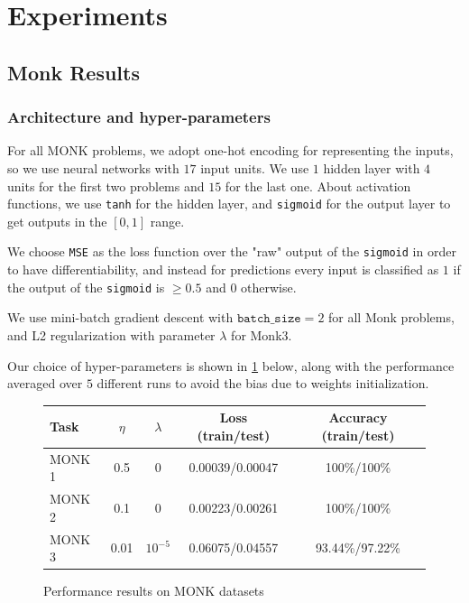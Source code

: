 \section{Experiments}

\subsection{Monk Results}

\subsubsection{Architecture and hyper-parameters}
For all MONK problems, we adopt one-hot encoding for representing the inputs, so we use neural networks with $17$ input units. We use $1$ hidden layer with $4$ units for the first two problems and $15$ for the last one. About activation functions, we use \texttt{tanh} for the hidden layer, and \texttt{sigmoid} for the output layer to get outputs in the $[0, 1]$ range.

We choose \texttt{MSE} as the loss function over the "raw" output of the \texttt{sigmoid} in order to have differentiability, and instead for predictions every input is classified as $1$ if the output of the \texttt{sigmoid} is $\ge 0.5$ and $0$ otherwise.

We use mini-batch gradient descent with $\texttt{batch\_size}=2$ for all Monk problems, and L2 regularization with parameter $\lambda$ for Monk3.

Our choice of hyper-parameters is shown in \cref{fig:hyper} below, along with the performance averaged over $5$ different runs to avoid the bias due to weights initialization.

\begin{figure}[h]
    \centering
    \begin{tabular}{|l|c|c|c|c|}
        \hline 
        Task & $\eta$ & $\lambda$ & Loss (train/test) & Accuracy (train/test) \\ \hline
        MONK 1 & 0.5 & 0 & 0.00039/0.00047  & 100\%/100\% \\ \hline
        MONK 2 & 0.1 & 0 & 0.00223/0.00261 & 100\%/100\% \\ \hline
        MONK 3 & 0.01 & $10^{-5}$ & 0.06075/0.04557 & 93.44\%/97.22\% \\ \hline
    \end{tabular}
    \caption{Performance results on MONK datasets}
    \label{fig:hyper}
\end{figure}

